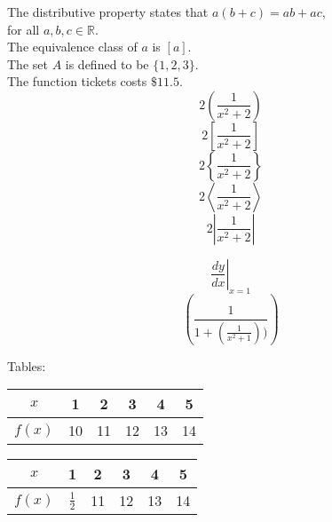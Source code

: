 \documentclass[11pt]{article}
\begin{document}
The distributive property states that $a(b+c) = ab + ac$, \\
for all $a, b, c \in \mathbb{R}$. \\[6pt]

The equivalence class of $a$ is $[a]$. \\ [6pt]

The set $A$ is defined to be $\{1, 2, 3\}$.\\[6pt]
The function tickets costs $\$11.5$. \\[6pt]

$$2\left(\frac{1}{x^2+2}\right)$$
$$2\left[\frac{1}{x^2+2}\right]$$
$$2\left\{\frac{1}{x^2+2}\right\}$$
$$2\left \langle \frac{1}{x^2+2}\right \rangle$$
$$2\left | \frac{1}{x^2+2}\right |$$

$$\left.\frac{dy}{dx}\right|_{x=1} $$
$$ \left (\frac{1} {1 +\left (\frac{1}{x^2+1} \right) )}\right)$$


Tables:\\



\begin{tabular}{|c|c|c|c|c|c|}
    \hline
    $x$ & 1 & 2 & 3 & 4 & 5 \\ \hline
    $f(x)$ & 10 & 11 & 12 & 13 & 14 \\ \hline
\end{tabular}

\vspace{1cm}

\begin{table}[H]
    \def\arraystretch{2}
    \begin{tabular}{|c||c|c|c|c|c|}
        \hline
        $x$ & 1 & 2 & 3 & 4 & 5 \\ \hline
        $f(x)$ & $\frac{1}{2}$  & 11 & 12 & 13 & 14 \\ \hline
    \end{tabular}
    
\end{table}
\end{document}
